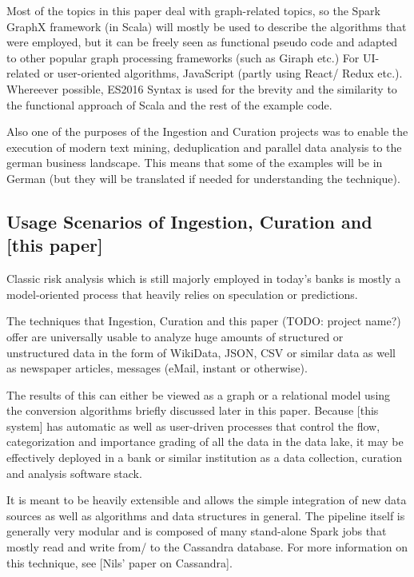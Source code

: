 \documentclass[
        a4paper,     %
        titlepage,   %
        twoside,     %
        parskip      %
        ]{scrartcl}  %
\begin{document}
    Most of the topics in this paper deal with graph-related topics, so the Spark GraphX framework
    (in Scala) will mostly be used to describe the algorithms that were employed,
    but it can be freely seen as functional pseudo code and adapted to other popular
    graph processing frameworks (such as Giraph etc.) %
    For UI-related or user-oriented algorithms, JavaScript (partly using React/ Redux etc.).
    Whereever possible, ES2016 Syntax is used for the brevity and the similarity
    to the functional approach of Scala and the rest of the example code.

    Also one of the purposes of the Ingestion and Curation projects was to enable
    the execution of modern text mining, deduplication and parallel data analysis
    to the german business landscape. This means that some of the examples will be
    in German (but they will be translated if needed for understanding the technique).

    \subsection{Usage Scenarios of Ingestion, Curation and [this paper]} %
    Classic risk analysis which is still majorly employed in today's banks is mostly
    a model-oriented process that heavily relies on speculation or predictions.

    The techniques that Ingestion, Curation and this paper (TODO: project name?)
    offer are universally usable to analyze huge amounts of structured or unstructured data
    in the form of WikiData, JSON, CSV or similar data as well as newspaper articles,
    messages (eMail, instant or otherwise).

    The results of this can either be viewed as a graph or a relational model
    using the conversion algorithms briefly discussed later in this paper. %
    Because [this system] has automatic as well as user-driven processes  %
    that control the flow, categorization and importance grading %
    of all the data in the data lake, it may be effectively deployed in a bank
    or similar institution as a data collection, curation and analysis software stack.

    It is meant to be heavily extensible and allows the simple integration of new data sources %
    as well as algorithms and data structures in general. The pipeline itself is generally very modular
    and is composed of many stand-alone Spark jobs that mostly read and write from/ to the Cassandra database.
    For more information on this technique, see [Nils' paper on Cassandra]. %
\end{document}
